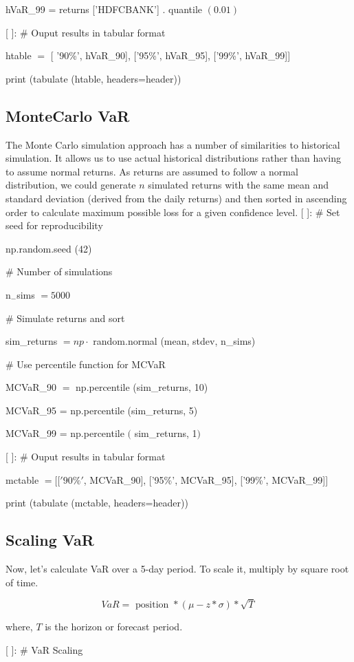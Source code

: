 \documentclass[10pt]{article}
\begin{document}
hVaR\_99 = returns ['HDFCBANK'] . quantile $(0.01)$

[ ]: \# Ouput results in tabular format

htable $=$ [ '90\%', hVaR\_90], ['95\%', hVaR\_95], ['99\%', hVaR\_99]]

print (tabulate (htable, headers=header))

\subsection*{MonteCarlo VaR}
The Monte Carlo simulation approach has a number of similarities to historical simulation. It allows us to use actual historical distributions rather than having to assume normal returns. As returns are assumed to follow a normal distribution, we could generate $n$ simulated returns with the same mean and standard deviation (derived from the daily returns) and then sorted in ascending order to calculate maximum possible loss for a given confidence level. [ ]: \# Set seed for reproducibility

np.random.seed (42)

\# Number of simulations

$\mathrm{n}_{-}$sims $=5000$

\# Simulate returns and sort

sim\_returns $=n p \cdot$ random.normal (mean, stdev, n\_sims)

\# Use percentile function for MCVaR

MCVaR\_90 $=$ np.percentile (sim\_returns, 10)

MCVaR\_95 = np.percentile (sim\_returns, 5)

MCVaR\_99 = np.percentile $($ sim\_returns, 1$)$

[ ]: \# Ouput results in tabular format

mctable $=[[' 90 \% '$, MCVaR\_90], ['95\%', MCVaR\_95], ['99\%', MCVaR\_99]]

print (tabulate (mctable, headers=header))

\subsection*{Scaling VaR}
Now, let's calculate VaR over a 5-day period. To scale it, multiply by square root of time.

$$
V a R=\text { position } *(\mu-z * \sigma) * \sqrt{T}
$$

where, $T$ is the horizon or forecast period.

[ ]: \# VaR Scaling
\end{document}
